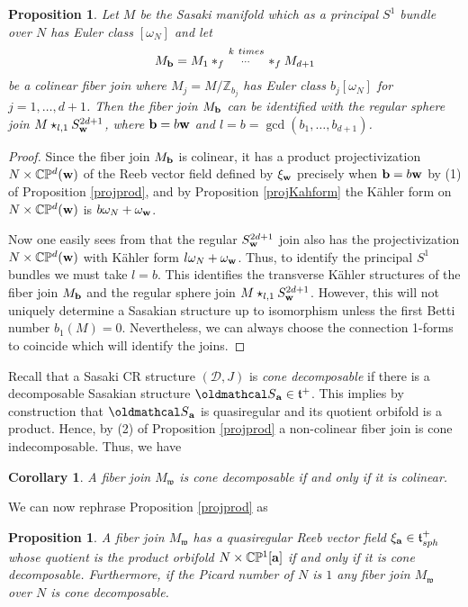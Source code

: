 \documentclass[12pt]{amsart}
\newtheorem{proposition}[theorem]{Proposition}
\newtheorem{corollary}[theorem]{Corollary}
\def\fract#1#2{\raise4pt\hbox{$ #1 \atop #2 $}}
\def\bbc{{\mathbb C}}
\def\bbp{{\mathbb P}}
\def\bbz{{\mathbb Z}}
\def\gro{\omega}
\def\bfa{{\bf a}}
\def\bfb{{\bf b}}
\def\bfw{{\bf w}}
\def\cald{{\mathcal D}}
\def\cals{{\oldmathcal S}}
\def\gt{{\mathfrak t}}
\def\gw{{\mathfrak w}}
\begin{document}
\begin{proposition}\label{joinsident}
Let $M$ be the Sasaki manifold which as a principal $S^1$ bundle over $N$ has Euler class $[\gro_N]$ and let 
$$M_{\bfb}=M_{1}*_f\fract{k~times}{\cdots}*_fM_{d+1}$$ 
be a colinear fiber join where $M_{j}=M/\bbz_{b_j}$ has Euler class $b_j[\gro_N]$ for $j=1,\dots,d+1$. Then the fiber join $M_\bfb$ can be identified with the regular sphere join $M\star_{l,1}S^{2d+1}_{\bfw}$, where $\bfb=b\bfw$ and $l=b=\gcd(b_1,\ldots,b_{d+1})$.
\end{proposition}


\begin{proof}
Since the fiber join $M_\bfb$ is colinear, it has a product projectivization $N\times \bbc\bbp^d(\bfw)$ of the Reeb vector field defined by $\xi_\bfw$ precisely when $\bfb=b\bfw$ by (1) of Proposition \ref{projprod}, and by Proposition \ref{projKahform} the K\"ahler form on $N\times \bbc\bbp^d(\bfw)$ is $b\gro_N+\gro_\bfw$.

Now one easily sees from \cite{BoTo14a} that the regular $S^{2d+1}_\bfw$ join also has the projectivization $N\times \bbc\bbp^d(\bfw)$ with K\"ahler form $l\gro_N+\gro_\bfw$. Thus, to identify the principal $S^1$ bundles we must take $l=b$. This identifies the transverse K\"ahler structures of the fiber join $M_\bfb$ and the regular sphere join $M\star_{l,1}S^{2d+1}_{\bfw}$. However, this will not uniquely determine a Sasakian structure \cite{Noz14} up to isomorphism unless the first Betti number $b_1(M)=0$. Nevertheless, we can always choose the connection 1-forms to coincide which will identify the joins.
\end{proof}

Recall \cite{BHLT16} that a Sasaki CR structure $(\cald,J)$ is {\it cone decomposable} if there is a decomposable Sasakian structure $\cals_\bfa\in \gt^+$. This implies by construction that $\cals_\bfa$ is quasiregular and its quotient orbifold is a product. Hence, by (2) of Proposition \ref{projprod} a non-colinear fiber join is cone indecomposable. Thus, we have
\begin{corollary}\label{fiberjoindecomp}
A fiber join $M_\gw$ is cone decomposable if and only if it is colinear.
\end{corollary}

We can now rephrase Proposition \ref{projprod} as
\begin{proposition}\label{projprod2}
A fiber join $M_\gw$ has a quasiregular Reeb vector field $\xi_\bfa\in\gt^+_{sph}$ whose quotient is the product orbifold $N\times \bbc\bbp^1[\bfa]$ if and only if it is cone decomposable. Furthermore, if the Picard number of $N$ is $1$ any fiber join $M_\gw$ over $N$ is cone decomposable.
\end{proposition}
\end{document}
